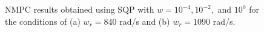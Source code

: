 \documentclass[journal]{IEEEtranTIE}
\begin{document}
\begin{figure}[!t]
\centering
{}
\vfill
{}
\caption{NMPC results obtained using SQP with $w = 10^{-4}, 10^{-2},$ and $10^{0}$ for the conditions of (a) $w_r = 840$ rad/s  and (b) $w_r = 1090$ rad/s.
}\label{Fig_SQP}
\end{figure}
\end{document}
